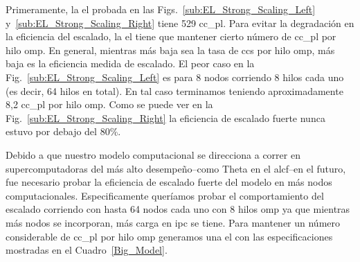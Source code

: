 {Primeramente, la \gls{el} probada en las Figs.~\ref{sub:EL_Strong_Scaling_Left} y~\ref{sub:EL_Strong_Scaling_Right} tiene 529 \gls{cc_pl}.
Para evitar la degradación en la eficiencia del escalado, la \gls{el} tiene que mantener cierto número de \gls{cc_pl} por hilo \gls{omp}.
En general, mientras más baja sea la tasa de \glspl{cc} por hilo \gls{omp}, más baja es la eficiencia medida de escalado.
El peor caso en la Fig.~\ref{sub:EL_Strong_Scaling_Left} es para 8 nodos corriendo 8 hilos cada uno (es decir, 64 hilos en total).
En tal caso terminamos teniendo aproximadamente 8,2 \gls{cc_pl} por hilo \gls{omp}.
Como se puede ver en la Fig.~\ref{sub:EL_Strong_Scaling_Right} la eficiencia de escalado fuerte nunca estuvo por debajo del 80\%.

Debido a que nuestro modelo computacional se direcciona a correr en supercomputadoras del más alto desempeño--como Theta en el \gls{alcf}--en el futuro, fue necesario probar la eficiencia de escalado fuerte del modelo en más nodos computacionales.
Especificamente queríamos probar el comportamiento del escalado corriendo con hasta 64 nodos cada uno con 8 hilos \gls{omp} ya que mientras más nodos se incorporan, más carga en \gls{ipc} se tiene.
Para mantener un número considerable de \gls{cc_pl} por  hilo \gls{omp} generamos una \gls{el} con las especificaciones mostradas en el Cuadro~\ref{Big_Model}.

}
